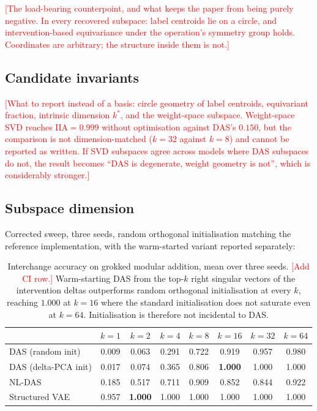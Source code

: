 \documentclass[11pt]{article}
\newcommand{\IIA}{\mathrm{IIA}}
\newcommand{\TODO}[1]{\textcolor{red}{[#1]}}
\begin{document}
\TODO{The load-bearing counterpoint, and what keeps the paper from being purely
negative. In every recovered subspace: label centroids lie on a circle, and
intervention-based equivariance under the operation's symmetry group holds.
Coordinates are arbitrary; the structure inside them is not.}

\subsection{Candidate invariants}

\TODO{What to report instead of a basis: circle geometry of label centroids,
equivariant fraction, intrinsic dimension $k^*$, and the weight-space subspace.
Weight-space SVD reaches $\IIA = 0.999$ without optimisation against DAS's
$0.150$, but the comparison is not dimension-matched ($k=32$ against $k=8$) and
cannot be reported as written. If SVD subspaces agree across models where DAS
subspaces do not, the result becomes ``DAS is degenerate, weight geometry is
not'', which is considerably stronger.}

\subsection{Subspace dimension}

Corrected sweep, three seeds, random orthogonal initialisation matching the
reference implementation, with the warm-started variant reported separately:

\begin{table}[t]
\centering\small
\setlength{\tabcolsep}{4pt}
\begin{tabular}{lccccccc}
\toprule
& $k{=}1$ & $k{=}2$ & $k{=}4$ & $k{=}8$ & $k{=}16$ & $k{=}32$ & $k{=}64$ \\
\midrule
DAS (random init)    & 0.009 & 0.063 & 0.291 & 0.722 & 0.919 & 0.957 & 0.980 \\
DAS (delta-PCA init) & 0.017 & 0.074 & 0.365 & 0.806 & \textbf{1.000} & 1.000 & 1.000 \\
NL-DAS               & 0.185 & 0.517 & 0.711 & 0.909 & 0.852 & 0.844 & 0.922 \\
Structured VAE       & 0.957 & \textbf{1.000} & 1.000 & 1.000 & 1.000 & 1.000 & 1.000 \\
\bottomrule
\end{tabular}
\caption{Interchange accuracy on grokked modular addition, mean over three seeds.
\TODO{Add CI row.} Warm-starting DAS from the top-$k$ right singular vectors of
the intervention deltas outperforms random orthogonal initialisation at every $k$,
reaching $1.000$ at $k=16$ where the standard initialisation does not saturate
even at $k=64$. Initialisation is therefore not incidental to DAS.}
\end{table}
\end{document}
